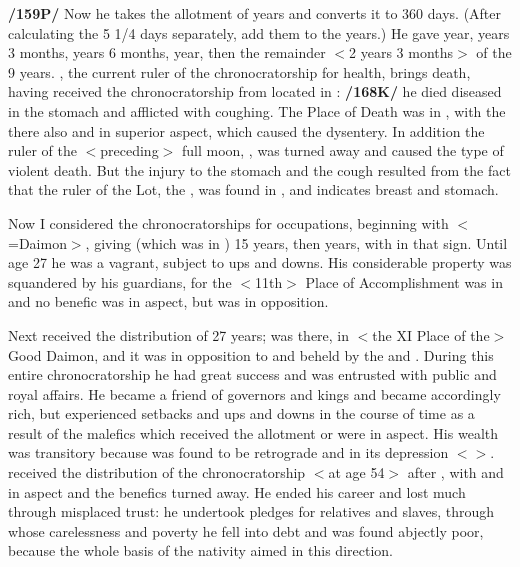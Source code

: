 \textbf{/159P/} Now he takes the allotment of years and converts it to 360 days. (After calculating the 5 1/4 days separately, add them to the years.) He gave \Sagittarius\xspace 1 year, \Capricorn\xspace 2 years 3 months, \Aquarius\xspace 2 years 6 months, \Pisces\xspace 1 year, then \Aries\xspace the remainder $<$2 years 3 months$>$ of the 9 years. \Mars, the current ruler of the chronocratorship for health, brings death, having received the chronocratorship from \Saturn\xspace located in \Sagittarius: \textbf{/168K/} he died diseased in the stomach and afflicted with coughing. The Place of Death was in \Pisces, with the \Moon\xspace there also and \Saturn\xspace in superior aspect, which caused the dysentery. In addition the ruler of the $<$preceding$>$ full moon, \Saturn, was turned away and caused the type of violent death. But the injury to the stomach and the cough resulted from the fact that the ruler of the Lot, the \Sun, was found in \Cancer, and \Cancer\xspace indicates breast and stomach.

Now I considered the chronocratorships for occupations, beginning with \Scorpio\xspace $<$=Daimon$>$, giving \Mars\xspace (which was in \Scorpio) 15 years, then \Sagittarius\xspace 12 years, with \Saturn\xspace in that sign. Until age 27 he was a vagrant, subject to ups and downs. His considerable property was squandered by his guardians, for
the $<$11th$>$ Place of Accomplishment was in \Gemini\xspace and no benefic was in aspect, but \Saturn\xspace was in
opposition. 

Next \Capricorn\xspace received the distribution of 27 years; \Jupiter\xspace was there, in $<$the XI Place of the$>$ Good Daimon, and it was in opposition to and beheld by the \Sun\xspace and \Venus. During this entire chronocratorship he had great success and was entrusted with public and royal affairs. He became a friend of governors and kings and became accordingly rich, but experienced setbacks and ups and downs in the course of time as a result of the malefics which received the allotment or were in aspect. His wealth was transitory because \Jupiter\xspace was found to be retrograde and in its depression $<$\Capricorn$>$. \Aquarius\xspace received
the distribution of the chronocratorship $<$at age 54$>$ after \Capricorn, with \Mars\xspace and \Mercury\xspace in aspect and
the benefics turned away. He ended his career and lost much through misplaced trust: he undertook pledges for relatives and slaves, through whose carelessness and poverty he fell into debt and was found abjectly poor, because the whole basis of the nativity aimed in this direction. 

